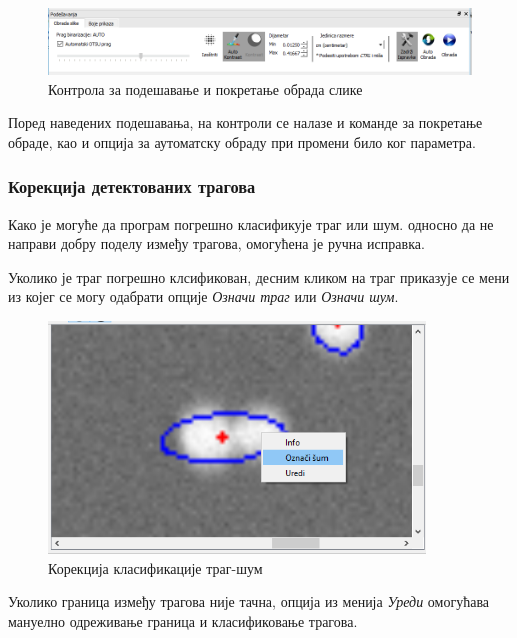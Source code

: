 \documentclass[11pt,a4paper,serbian,oneside]{book}
\begin{document}
\begin{figure}[H]
\begin{center}
\includegraphics[width=150mm]{images/processing.png}
\end{center}
\caption{Контрола за подешавање и покретање обрада слике}
\label{fig:processing}
\end{figure}

Поред наведених подешавања, на контроли се налазе и команде за покретање об\-ра\-де, као и опција за аутоматску обраду при промени било ког параметра.

\subsubsection{Корекција детектованих трагова}

Како је могуће да програм погрешно класификује траг или шум. односно да не направи добру поделу између трагова, омогућена је ручна исправка.

Уколико је траг погрешно клсификован, десним кликом на траг приказује се мени из којег се могу одабрати опције \textit{Означи траг} или \textit{Означи шум}.

\begin{figure}[H]
\begin{center}
\includegraphics[width=100mm]{images/oznaci.png}
\end{center}
\caption{Корекција класификације траг-шум}
\label{fig:mark}
\end{figure}

Уколико граница између трагова није тачна, опција из менија \textit{Уреди} омогућава мануелно одреживање граница и класификовање трагова.
\end{document}
